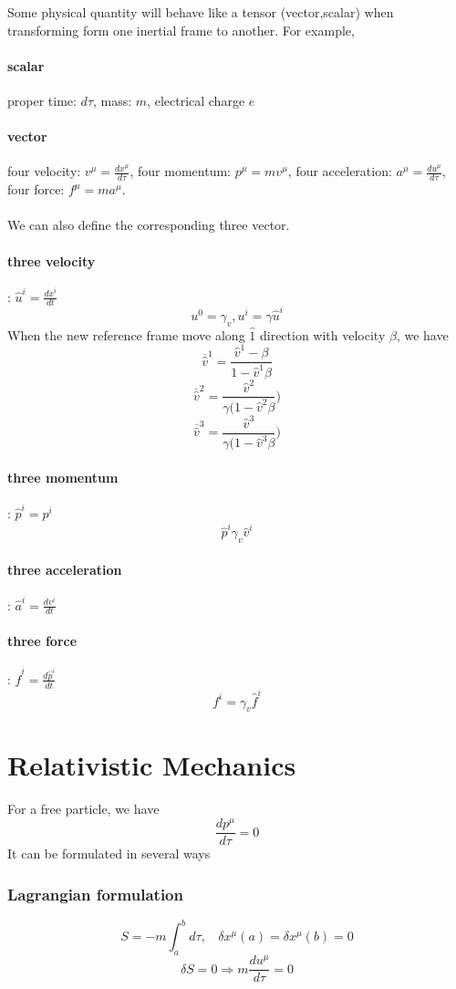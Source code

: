 \documentclass[cyan]{elegantnote}
\begin{document}
Some physical quantity will behave like a tensor (vector,scalar) when transforming form one inertial frame to another. For example,
\paragraph{scalar} proper time: $d \tau$, mass: $m$, electrical charge $e$
\paragraph{vector} four velocity: $v^{\mu} = \frac{dx^{\mu}}{d \tau}$, four momentum: $p^{\mu} = m v^{\mu}$, four acceleration: $a^{\mu} = \frac{du^{\mu}}{d \tau}$, four force: $f^{\mu} = m a^{\mu}$.\\ \\
\noindent
We can also define the corresponding three vector.
\paragraph{three velocity}: $\hat{u}^{i} = \frac{dx^i}{dt}$
\[u^0 = \gamma_v, u^i = \gamma \hat{u}^i\]
When the new reference frame move along $\hat{1}$ direction with velocity $\beta$, we have
\[\overline{\hat{v}}^1 = \frac{\hat{v}^1 - \beta}{1-\hat{v}^1 \beta}\]
\[\overline{\hat{v}}^2 = \frac{\hat{v}^2}{\gamma(1-\hat{v}^2 \beta})\]
\[\overline{\hat{v}}^3 = \frac{\hat{v}^3}{\gamma(1-\hat{v}^3 \beta})\]
\paragraph{three momentum}: $\hat{p}^{i} = p^i$
\[\hat{p}^{i} \gamma_v \hat{v}^i\]
\paragraph{three acceleration}: $\hat{a}^{i} = \frac{dv^i}{dt}$\\
\paragraph{three force}: $\hat{f}^i = \frac{d\hat{p}^i}{dt}$
\[f^i = \gamma_v \hat{f}^i\]

\section{Relativistic Mechanics}
\noindent
For a free particle, we have
\[\frac{dp^{\mu}}{d\tau} = 0\]
It can be formulated in several ways
\subsubsection{Lagrangian formulation}
\[S=-m\int_{a}^{b} d\tau, \ \ \ \ \delta x^{\mu}(a) = \delta x^{\mu}(b) = 0\]
\[\delta S = 0 \Rightarrow m\frac{du^{\mu}}{d\tau} = 0\]
\end{document}

